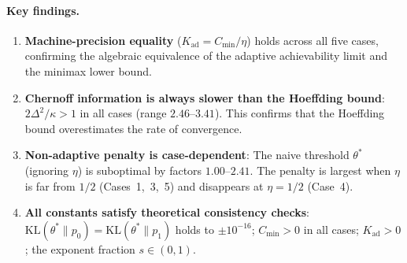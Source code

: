 \documentclass[article]{amsart}
\theoremstyle{definition}
\begin{document}
\paragraph{Key findings.}
\begin{enumerate}
    \item \textbf{Machine-precision equality} ($K_{\mathrm{ad}} = C_{\min}/\eta$) holds across all five cases, confirming the algebraic equivalence of the adaptive achievability limit and the minimax lower bound.
    \item \textbf{Chernoff information is always slower than the Hoeffding bound}: $2\Delta^2 / \kappa > 1$ in all cases (range $2.46$--$3.41$). This confirms that the Hoeffding bound overestimates the rate of convergence.
    \item \textbf{Non-adaptive penalty is case-dependent}: The naive threshold $\theta^*$ (ignoring $\eta$) is suboptimal by factors $1.00$--$2.41$. The penalty is largest when $\eta$ is far from $1/2$ (Cases~1,~3,~5) and disappears at $\eta = 1/2$ (Case~4).
    \item \textbf{All constants satisfy theoretical consistency checks}: $\mathrm{KL}(\theta^*\|p_0) = \mathrm{KL}(\theta^*\|p_1)$ holds to $\pm 10^{-16}$; $C_{\min} > 0$ in all cases; $K_{\mathrm{ad}} > 0$; the exponent fraction $s \in (0,1)$.
\end{enumerate}
\end{document}
